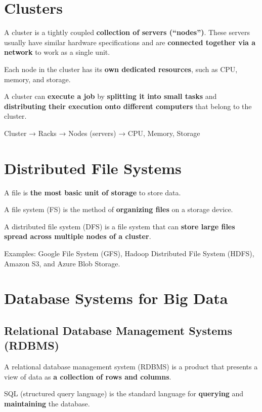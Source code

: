 \documentclass[12pt,a4paper]{report}
\begin{document}
\section{Clusters}
A cluster is a tightly coupled \textbf{collection of servers (``nodes'')}. These servers usually have similar hardware specifications and are \textbf{connected together via a network} to work as a single unit.

Each node in the cluster has its \textbf{own dedicated resources}, such as CPU, memory, and storage.

A cluster can \textbf{execute a job} by \textbf{splitting it into small tasks} and \textbf{distributing their execution onto different computers} that belong to the cluster.

\begin{mdframed}
Cluster → Racks → Nodes (servers) → CPU, Memory, Storage
\end{mdframed}

\section{Distributed File Systems}
A file is \textbf{the most basic unit of storage} to store data.

A file system (FS) is the method of \textbf{organizing files} on a storage device.

A distributed file system (DFS) is a file system that can \textbf{store large files spread across multiple nodes of a cluster}.

\begin{mdframed}
Examples: Google File System (GFS), Hadoop Distributed File System (HDFS), Amazon S3, and Azure Blob Storage.
\end{mdframed}

\section{Database Systems for Big Data}

\subsection{Relational Database Management Systems (RDBMS)}
A relational database management system (RDBMS) is a product that presents a view of data as \textbf{a collection of rows and columns}.

SQL (structured query language) is the standard language for \textbf{querying} and \textbf{maintaining} the database.
\end{document}
